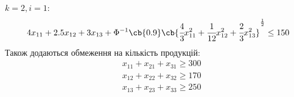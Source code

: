 $k=2,i=1$:\\
\begin{equation}
4x_{11} + 2.5x_{12} + 3x_{13} + \Phi^{-1}\cb{0.9}\cb{\cfrac43x^2_{11}+\cfrac1{12}x_{12}^2+\cfrac23 x_{13}^2}^{\frac12} \leq 150
\end{equation}
Також додаються обмеження на кількість продукцій:\\
\begin{eqnarray}
&x_{11}+x_{21}+x_{31} \geq 300\\
&x_{12}+x_{22}+x_{32} \geq 170\\
&x_{13}+x_{23}+x_{33} \geq 250
\end{eqnarray}

